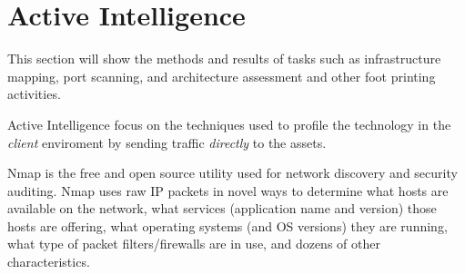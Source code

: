   \section {Active Intelligence}\label{sec:activeint}

    This section will show the methods and results of tasks such as
    infrastructure mapping, port scanning, and architecture assessment and other
    foot printing activities.

    Active Intelligence focus on the techniques used to profile the technology
    in the \textit{client} enviroment by sending traffic \textit{directly} to
    the assets.

    Nmap is the free and open source utility used for network discovery and
    security auditing. Nmap uses raw IP packets in novel ways to determine what
    hosts are available on the network, what services (application name and
    version) those hosts are offering, what operating systems (and OS versions)
    they are running, what type of packet filters/firewalls are in use, and
    dozens of other characteristics.

